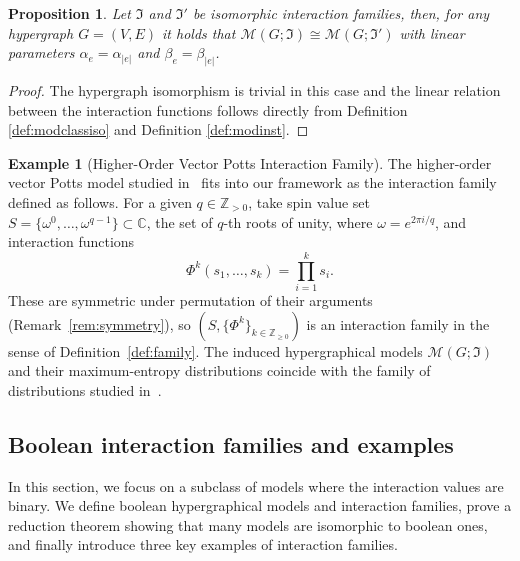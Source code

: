 \documentclass[11pt,reqno]{amsart}
\newcommand{\Mo}{\mathcal{M}}
\newcommand{\IFam}{\mathfrak{I}}
\newcommand{\sset}{spin value set }
\theoremstyle{plain}
\newtheorem{proposition}[theorem]{Proposition}
\theoremstyle{definition}
\newtheorem{example}[theorem]{Example}
\numberwithin{equation}{section}
\begin{document}
\begin{proposition}
    \label{prop:isoinstant}
    Let $\IFam$ and $\IFam'$ be isomorphic interaction families, then, for any hypergraph $G = (V,E)$ it holds that $\Mo(G; \IFam) \cong \Mo(G; \IFam')$ with linear parameters $\alpha_e = \alpha_{|e|}$ and $\beta_e = \beta_{|e|}$.
\end{proposition}
\begin{proof}
    The hypergraph isomorphism is trivial in this case and the linear relation between the interaction functions follows directly from Definition \ref{def:modclassiso} and Definition \ref{def:modinst}.
\end{proof}

\begin{example}[Higher-Order Vector Potts Interaction Family]
    \label{ex:vectorpotts}
    The higher-order vector Potts model studied in~\cite{deClercq2026}
    fits into our framework as the interaction family defined as
    follows. For a given $q \in \mathbb{Z}_{>0}$, take \sset $S = \{
    \omega^0, \dots, \omega^{q-1} \} \subset \mathbb{C}$, the set of
    $q$-th roots of unity, where $\omega = e^{2\pi i / q}$, and
    interaction functions
    \[
        \Phi^k(s_1, \dots, s_k) = \prod_{i=1}^k s_i.
    \]
    These are symmetric under permutation of their arguments
    (Remark~\ref{rem:symmetry}), so $(S, \{\Phi^k\}_{k \in
    \mathbb{Z}_{\geq 0}})$ is an interaction family in the sense of
    Definition~\ref{def:family}. The induced hypergraphical models
    $\Mo(G; \IFam)$ and their maximum-entropy distributions
    coincide with the family of distributions studied
    in~\cite{deClercq2026}.
\end{example}

\subsection{Boolean interaction families and examples}
\label{sec:boolean_and_examples}

In this section, we focus on a subclass of models where the interaction values are binary. We define boolean hypergraphical models and interaction families, prove a reduction theorem showing that many models are isomorphic to boolean ones, and finally introduce three key examples of interaction families.
\end{document}

